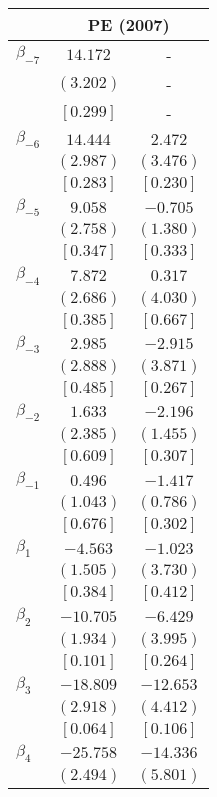 \documentclass[12pt]{article}
\begin{document}
\begin{table}[H]
\centering
\label{tab:outside_home_event_study_PE}
\begin{tabular}{lcc}
\toprule
& \multicolumn{2}{c}{PE (2007)} \\
\cmidrule(lr){2-3}
\midrule
$\beta_{-7}$ & $ 14.172$ & - \\
& $(  3.202)$ & - \\
& $[  0.299]$ & - \\
$\beta_{-6}$ & $ 14.444$ & $  2.472$ \\
& $(  2.987)$ & $(  3.476)$ \\
& $[  0.283]$ & $[  0.230]$ \\
$\beta_{-5}$ & $  9.058$ & $ -0.705$ \\
& $(  2.758)$ & $(  1.380)$ \\
& $[  0.347]$ & $[  0.333]$ \\
$\beta_{-4}$ & $  7.872$ & $  0.317$ \\
& $(  2.686)$ & $(  4.030)$ \\
& $[  0.385]$ & $[  0.667]$ \\
$\beta_{-3}$ & $  2.985$ & $ -2.915$ \\
& $(  2.888)$ & $(  3.871)$ \\
& $[  0.485]$ & $[  0.267]$ \\
$\beta_{-2}$ & $  1.633$ & $ -2.196$ \\
& $(  2.385)$ & $(  1.455)$ \\
& $[  0.609]$ & $[  0.307]$ \\
$\beta_{-1}$ & $  0.496$ & $ -1.417$ \\
& $(  1.043)$ & $(  0.786)$ \\
& $[  0.676]$ & $[  0.302]$ \\
$\beta_{1}$ & $ -4.563$ & $ -1.023$ \\
& $(  1.505)$ & $(  3.730)$ \\
& $[  0.384]$ & $[  0.412]$ \\
$\beta_{2}$ & $-10.705$ & $ -6.429$ \\
& $(  1.934)$ & $(  3.995)$ \\
& $[  0.101]$ & $[  0.264]$ \\
$\beta_{3}$ & $-18.809$ & $-12.653$ \\
& $(  2.918)$ & $(  4.412)$ \\
& $[  0.064]$ & $[  0.106]$ \\
$\beta_{4}$ & $-25.758$ & $-14.336$ \\
& $(  2.494)$ & $(  5.801)$ \\

\end{tabular}
\end{table}
\end{document}
